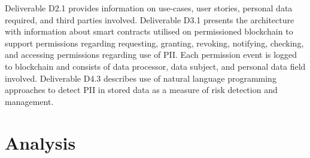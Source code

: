 Deliverable D2.1 \cite{noauthor_d2.1_2018} provides information on use-cases, user stories, personal data required, and third parties involved. Deliverable D3.1 \cite{noauthor_d3.1_2019} presents the architecture with information about smart contracts utilised on permissioned blockchain to support permissions regarding requesting, granting, revoking, notifying, checking, and accessing permissions regarding use of PII. Each permission event is logged to blockchain and consists of data processor, data subject, and personal data field involved. Deliverable D4.3 \cite{noauthor_d4.3_2019} describes use of natural language programming approaches to detect PII in stored data as a measure of risk detection and management.

\section{Analysis}\label{sec:sota:analysis}

